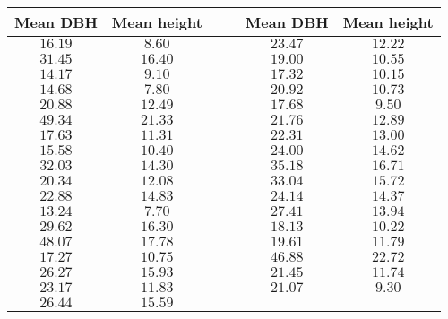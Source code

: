 \begin{tabular}{ccrrcc} \toprule
Mean DBH & Mean height &&& Mean DBH & Mean height \\\midrule
$16.19$  & $8.60$      &&& $23.47$  & $12.22$ \\
$31.45$  & $16.40$     &&& $19.00$  & $10.55$ \\
$14.17$  & $9.10$      &&& $17.32$  & $10.15$ \\
$14.68$  & $7.80$      &&& $20.92$  & $10.73$ \\
$20.88$  & $12.49$     &&& $17.68$  & $9.50$  \\
$49.34$  & $21.33$     &&& $21.76$  & $12.89$ \\
$17.63$  & $11.31$     &&& $22.31$  & $13.00$ \\
$15.58$  & $10.40$     &&& $24.00$  & $14.62$ \\
$32.03$  & $14.30$     &&& $35.18$  & $16.71$ \\
$20.34$  & $12.08$     &&& $33.04$  & $15.72$ \\
$22.88$  & $14.83$     &&& $24.14$  & $14.37$ \\
$13.24$  & $7.70$      &&& $27.41$  & $13.94$ \\
$29.62$  & $16.30$     &&& $18.13$  & $10.22$ \\
$48.07$  & $17.78$     &&& $19.61$  & $11.79$ \\
$17.27$  & $10.75$     &&& $46.88$  & $22.72$ \\
$26.27$  & $15.93$     &&& $21.45$  & $11.74$ \\
$23.17$  & $11.83$     &&& $21.07$  & $9.30$  \\
$26.44$  & $15.59$ \\\bottomrule
\end{tabular}
